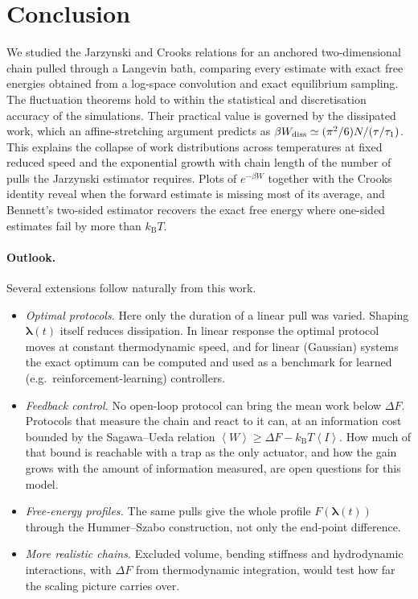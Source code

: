\documentclass[11pt,a4paper]{article}
\newcommand{\kT}{k_{\mathrm B}T}
\newcommand{\avg}[1]{\left\langle #1\right\rangle}
\newcommand{\lam}{\bm{\lambda}}
\newcommand{\Wd}{W_{\rm diss}}
\begin{document}
\section{Conclusion}

We studied the Jarzynski and Crooks relations for an anchored two-dimensional chain pulled through a
Langevin bath, comparing every estimate with exact free energies obtained from a log-space convolution
and exact equilibrium sampling. The fluctuation theorems hold to within the statistical and discretisation
accuracy of the simulations. Their practical value is governed by the dissipated work, which an
affine-stretching argument predicts as $\beta\Wd\simeq(\pi^2/6)N/(\tau/\tau_1)$. This explains the collapse of
work distributions across temperatures at fixed reduced speed and the exponential growth with chain length
of the number of pulls the Jarzynski estimator requires. Plots of $e^{-\beta W}$ together with the Crooks identity
reveal when the forward estimate is missing most of its average, and Bennett's two-sided estimator recovers
the exact free energy where one-sided estimates fail by more than $\kT$.

\paragraph{Outlook.} Several extensions follow naturally from this work.
\begin{itemize}[leftmargin=*,itemsep=1pt]
\item \emph{Optimal protocols.} Here only the duration of a linear pull was varied. Shaping $\lam(t)$ itself
reduces dissipation. In linear response the optimal protocol moves at constant thermodynamic speed, and for
linear (Gaussian) systems the exact optimum can be computed and used as a benchmark for learned
(e.g.\ reinforcement-learning) controllers.
\item \emph{Feedback control.} No open-loop protocol can bring the mean work below $\Delta F$. Protocols that
measure the chain and react to it can, at an information cost bounded by the Sagawa--Ueda relation
$\avg W\ge\Delta F-\kT\avg I$. How much of that bound is reachable with a trap as the only actuator, and how the
gain grows with the amount of information measured, are open questions for this model.
\item \emph{Free-energy profiles.} The same pulls give the whole profile $F(\lam(t))$ through the
Hummer--Szabo construction, not only the end-point difference.
\item \emph{More realistic chains.} Excluded volume, bending stiffness and hydrodynamic interactions, with
$\Delta F$ from thermodynamic integration, would test how far the scaling picture carries over.
\end{itemize}
\end{document}
